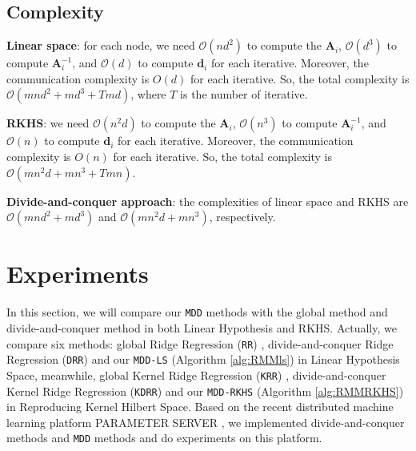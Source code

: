 \documentclass{article}
\begin{document}
\subsection{Complexity}
\textbf{Linear space}:  for each node, we need $\mathcal{O}\left(nd^2\right)$ to compute the $\mathbf A_i$,  $\mathcal{O}(d^3)$
to compute $\mathbf A_i^{-1}$,  and $\mathcal{O}(d)$ to compute $\mathbf d_i$ for each iterative.
Moreover, the communication complexity is $O(d)$ for each iterative.
So, the total complexity is $\mathcal{O}\left(mnd^2+md^3+Tmd\right)$, where $T$ is the number of iterative.

\textbf{RKHS}: we need $\mathcal{O}\left(n^2d\right)$ to compute the $\mathbf A_i$, $\mathcal{O}(n^3)$
to compute $\mathbf A_i^{-1}$,  and $\mathcal{O}(n)$ to compute $\mathbf d_i$ for each iterative.
Moreover, the communication complexity is $O(n)$ for each iterative.
So, the total complexity is $\mathcal{O}\left(mn^2d+mn^3+Tmn\right)$.

\textbf{Divide-and-conquer approach}: the complexities of linear space and RKHS
are $\mathcal{O}\left(mnd^2+md^3\right)$ and $\mathcal{O}\left(mn^2d+mn^3\right)$, respectively.


\section{Experiments}
In this section, we will compare our  \texttt{MDD} methods with the global method and divide-and-conquer method in both Linear Hypothesis and RKHS.
Actually, we compare six methods: global Ridge Regression (\texttt{RR}) \cite{hoerl1970ridge},
divide-and-conquer Ridge Regression (\texttt{DRR}) and our \texttt{MDD-LS} (Algorithm \ref{alg:RMMls}) in Linear Hypothesis Space,
meanwhile, global Kernel Ridge Regression (\texttt{KRR}) \cite{an2007fast},
divide-and-conquer Kernel Ridge Regression (\texttt{KDRR}) \cite{Zhang2013} and our \texttt{MDD-RKHS} (Algorithm \ref{alg:RMMRKHS}) in Reproducing Kernel Hilbert Space.
Based on the recent distributed machine learning platform PARAMETER SERVER \cite{li2014scaling},
we implemented divide-and-conquer methods and \texttt{MDD} methods and do experiments on this platform.
\end{document}
